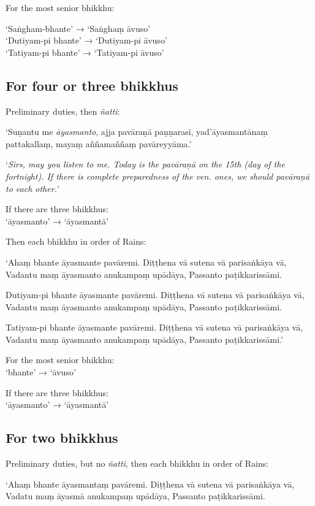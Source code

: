 For the most senior bhikkhu:

‘Saṅgham-bhante’ → ‘Saṅghaṃ āvuso’\\
‘Dutiyam-pi bhante’ → ‘Dutiyam-pi āvuso’\\
‘Tatiyam-pi bhante’ → ‘Tatiyam-pi āvuso’

\subsection{For four or three bhikkhus}

Preliminary duties, then \emph{ñatti}:

‘Suṇantu me \emph{āyasmanto}, ajja pavāraṇā paṇṇarasī, yad'āyasmantānaṃ
pattakallaṃ, mayaṃ aññamaññaṃ pavāreyyāma.’

‘\emph{Sirs, may you listen to me. Today is the pavāraṇā on the 15th (day of the
fortnight). If there is complete preparedness of the ven. ones, we should
pavāraṇā to each other.}’


If there are three bhikkhus:\\
‘āyasmanto’ → ‘āyasmantā’

Then each bhikkhu in order of Rains:

‘Ahaṃ bhante āyasmante pavāremi. Diṭṭhena vā sutena vā parisaṅkāya vā, Vadantu
maṃ āyasmanto anukampaṃ upādāya, Passanto paṭikkarissāmi.

Dutiyam-pi bhante āyasmante pavāremi. Diṭṭhena vā sutena vā parisaṅkāya vā,
Vadantu maṃ āyasmanto anukampaṃ upādāya, Passanto paṭikkarissāmi.

Tatiyam-pi bhante āyasmante pavāremi. Diṭṭhena vā sutena vā parisaṅkāya vā,
Vadantu maṃ āyasmanto anukampaṃ upādāya, Passanto paṭikkarissāmi.’

For the most senior bhikkhu:\\
‘bhante’ → ‘āvuso’

If there are three bhikkhus:\\
‘āyasmanto’ → ‘āyasmantā’

\subsection{For two bhikkhus}

Preliminary duties, but no \emph{ñatti}, then each bhikkhu in order of Rains:

‘Ahaṃ bhante āyasmantaṃ pavāremi. Diṭṭhena vā sutena vā parisaṅkāya vā, Vadatu
maṃ āyasmā anukampaṃ upādāya, Passanto paṭikkarissāmi.

